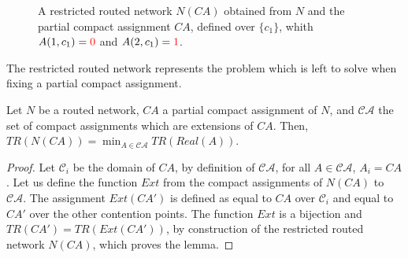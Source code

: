 \begin{figure}
\begin{center}
{
}

 \caption{A restricted routed network $N(CA)$ obtained from $N$ and the partial compact assignment $CA$, defined over $\{c_1\}$, whith $A(1,c_1) = \textcolor{red}{0}$ and $A(2,c_1) = \textcolor{red}{1}$.}

\label{fig:randomnetworks}
\end{center}
\end{figure}

The restricted routed network represents the problem which is left to solve 
when fixing a partial compact assignment.

\begin{lemma}\label{lemma:restriction}
Let $N$ be a routed network, $CA$ a partial compact assignment of $N$, and $\mathcal{CA}$
the set of compact assignments which are extensions of $CA$. Then, $TR(N(CA)) = \min_{ A \in \mathcal{CA}} TR(Real(A))$.
\end{lemma}
\begin{proof}
Let $\mathcal{C}_i$ be the domain of $CA$, by definition of $\mathcal{CA}$, 
for all $A \in \mathcal{CA}$, $A_i = CA$. Let us define the function $Ext$ from the
compact assignments of $N(CA)$ to $\mathcal{CA}$. The assignment $Ext(CA')$ is 
defined as equal to $CA$ over $\mathcal{C}_i$ and equal to $CA'$ over the other contention points.
The function $Ext$ is a bijection and $TR(CA') = TR(Ext(CA'))$, by construction of the restricted routed network
$N(CA)$, which proves the lemma.
\end{proof}

